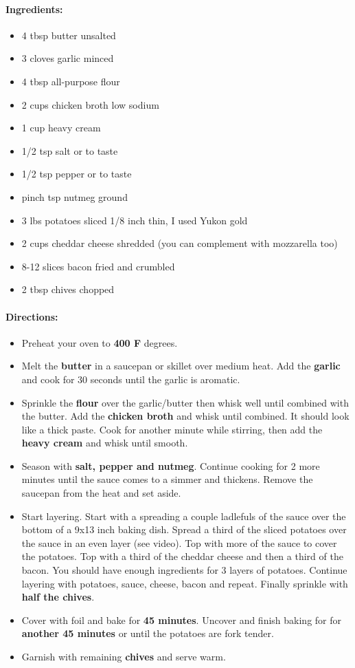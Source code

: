 \documentclass{article}
\begin{document}
\paragraph{Ingredients:}
\begin{itemize}
\item 4 tbsp butter unsalted
\item 3 cloves garlic minced
\item 4 tbsp all-purpose flour
\item 2 cups chicken broth low sodium
\item 1 cup heavy cream
\item 1/2 tsp salt or to taste
\item 1/2 tsp pepper or to taste
\item pinch tsp nutmeg ground
\item 3 lbs potatoes sliced 1/8 inch thin, I used Yukon gold
\item 2 cups cheddar cheese shredded (you can complement with mozzarella too)
\item 8-12 slices bacon fried and crumbled
\item 2 tbsp chives chopped
\end{itemize}

\paragraph{Directions:}
\begin{itemize}
\item Preheat your oven to \textbf{400 F} degrees.
\item Melt the \textbf{butter} in a saucepan or skillet over medium heat. Add the \textbf{garlic} and cook for 30 seconds until
the garlic is aromatic.
\item Sprinkle the \textbf{flour} over the garlic/butter then whisk well until combined with the butter. Add the \textbf{chicken broth} and whisk until combined. It should look like a thick paste. Cook for another minute while stirring, then add the \textbf{heavy cream} and whisk until smooth.
\item Season with \textbf{salt, pepper and nutmeg}. Continue cooking for 2 more minutes until the sauce comes to a simmer and thickens. Remove the saucepan from the heat and set aside.
\item Start layering. Start with a spreading a couple ladlefuls of the sauce over the bottom of a 9x13 inch baking dish. Spread a third of the sliced potatoes over the sauce in an even layer (see video). Top with
more of the sauce to cover the potatoes. Top with a third of the cheddar cheese and then a third of the bacon. You should have enough ingredients for 3 layers of potatoes. Continue layering with potatoes, sauce, cheese, bacon and repeat. Finally sprinkle with \textbf{half the chives}.
\item Cover with foil and bake for \textbf{45 minutes}. Uncover and finish baking for for \textbf{another 45 minutes} or until the potatoes are fork tender.
\item Garnish with remaining \textbf{chives} and serve warm.
\end{itemize}
\end{document}

